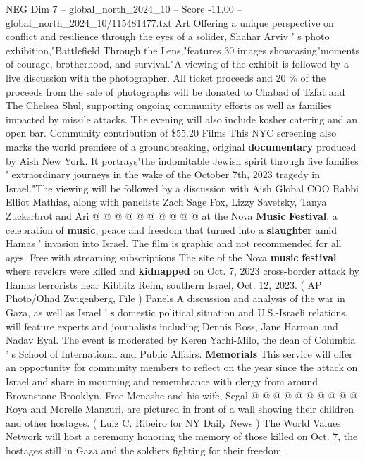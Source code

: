 \begin{textsample}{NEG Dim 7 – global\_north\_2024\_10 – Score -11.00 – global\_north\_2024\_10/115481477.txt}  \label{ex:f7_neg_035}
Art Offering a unique perspective on conflict and resilience through the eyes of a solider, Shahar Arviv ' s photo exhibition,"Battlefield Through the Lens,"features 30 images showcasing"moments of courage, brotherhood, and survival."A viewing of the exhibit is followed by a live discussion with the photographer.
All ticket proceeds and 20 \% of the proceeds from the sale of photographs will be donated to Chabad of Tzfat and The Chelsea Shul, supporting ongoing community efforts as well as families impacted by missile attacks.
The evening will also include kosher catering and an open bar.
Community contribution of \$55.20 Films This NYC screening also marks the world premiere of a groundbreaking, original \textbf{documentary} produced by Aish New York.
It portrays"the indomitable Jewish spirit through five families ' extraordinary journeys in the wake of the October 7th, 2023 tragedy in Israel."The viewing will be followed by a discussion with Aish Global COO Rabbi Elliot Mathias, along with panelists Zach Sage Fox, Lizzy Savetsky, Tanya Zuckerbrot and Ari @ @ @ @ @ @ @ @ @ @ at the Nova \textbf{Music} \textbf{Festival}, a celebration of \textbf{music}, peace and freedom that turned into a \textbf{slaughter} amid Hamas ' invasion into Israel.
The film is graphic and not recommended for all ages.
Free with streaming subscriptions The site of the Nova \textbf{music} \textbf{festival} where revelers were killed and \textbf{kidnapped} on Oct. 7, 2023 cross-border attack by Hamas terrorists near Kibbitz Reim, southern Israel, Oct. 12, 2023. ( AP Photo/Ohad Zwigenberg, File ) Panels A discussion and analysis of the war in Gaza, as well as Israel ' s domestic political situation and U.S.-Israeli relations, will feature experts and journalists including Dennis Ross, Jane Harman and Nadav Eyal.
The event is moderated by Keren Yarhi-Milo, the dean of Columbia ' s School of International and Public Affairs. \textbf{Memorials} This service will offer an opportunity for community members to reflect on the year since the attack on Israel and share in mourning and remembrance with clergy from around Brownstone Brooklyn.
Free Menashe and his wife, Segal @ @ @ @ @ @ @ @ @ @ Roya and Morelle Manzuri, are pictured in front of a wall showing their children and other hostages. ( Luiz C.
Ribeiro for NY Daily News ) The World Values Network will host a ceremony honoring the memory of those killed on Oct. 7, the hostages still in Gaza and the soldiers fighting for their freedom.

\end{textsample}

